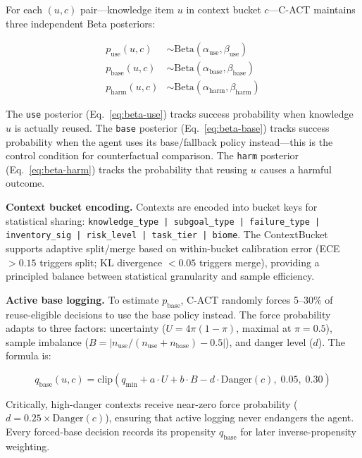 \documentclass[letterpaper]{article}
\begin{document}
For each $(u, c)$ pair---knowledge item $u$ in context bucket $c$---\textsc{C-ACT} maintains three independent Beta posteriors:

\begin{align}
p_{\text{use}}(u, c) &\sim \text{Beta}(\alpha_{\text{use}}, \beta_{\text{use}}) \label{eq:beta-use} \\
p_{\text{base}}(u, c) &\sim \text{Beta}(\alpha_{\text{base}}, \beta_{\text{base}}) \label{eq:beta-base} \\
p_{\text{harm}}(u, c) &\sim \text{Beta}(\alpha_{\text{harm}}, \beta_{\text{harm}}) \label{eq:beta-harm}
\end{align}

The \texttt{use} posterior (Eq.~\ref{eq:beta-use}) tracks success probability when knowledge $u$ is actually reused. The \texttt{base} posterior (Eq.~\ref{eq:beta-base}) tracks success probability when the agent uses its base/fallback policy instead---this is the control condition for counterfactual comparison. The \texttt{harm} posterior (Eq.~\ref{eq:beta-harm}) tracks the probability that reusing $u$ causes a harmful outcome.

\textbf{Context bucket encoding.} Contexts are encoded into bucket keys for statistical sharing: \texttt{knowledge\_type | subgoal\_type | failure\_type | inventory\_sig | risk\_level | task\_tier | biome}. The ContextBucket supports adaptive split/merge based on within-bucket calibration error (ECE $> 0.15$ triggers split; KL divergence $< 0.05$ triggers merge), providing a principled balance between statistical granularity and sample efficiency.

\textbf{Active base logging.} To estimate $p_{\text{base}}$, \textsc{C-ACT} randomly forces 5--30\% of reuse-eligible decisions to use the base policy instead. The force probability adapts to three factors: uncertainty ($U = 4\pi(1-\pi)$, maximal at $\pi=0.5$), sample imbalance ($B = |n_{\text{use}} / (n_{\text{use}} + n_{\text{base}}) - 0.5|$), and danger level ($d$). The formula is:

\begin{equation}
q_{\text{base}}(u,c) = \text{clip}(q_{\min} + a \cdot U + b \cdot B - d \cdot \text{Danger}(c), \; 0.05, \; 0.30)
\end{equation}

Critically, high-danger contexts receive near-zero force probability ($d=0.25 \times \text{Danger}(c)$), ensuring that active logging never endangers the agent. Every forced-base decision records its propensity $q_{\text{base}}$ for later inverse-propensity weighting.
\end{document}
